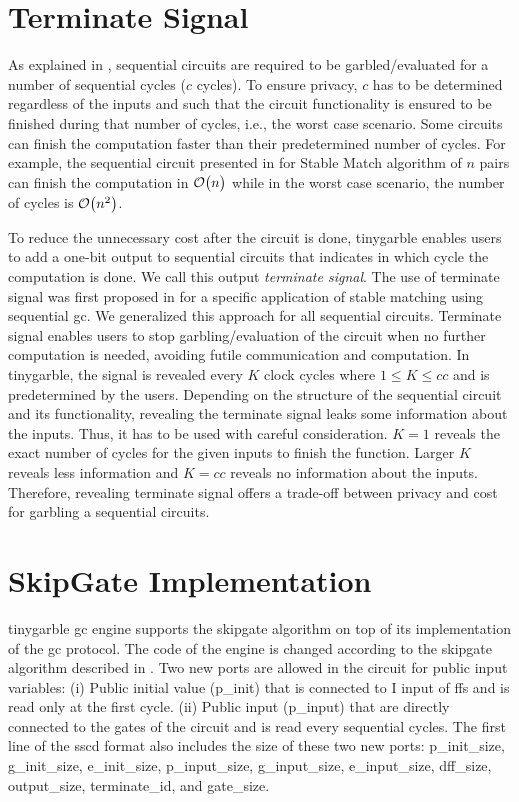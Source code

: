 \section{Terminate Signal}\label{sec:engine-term}
As explained in , sequential circuits are required to be garbled/evaluated for a number of sequential cycles ($c$ cycles).
To ensure privacy, $c$ has to be determined regardless of the inputs and such that the circuit functionality is ensured to be finished during that number of cycles, i.e., the worst case scenario.
Some circuits can finish the computation faster than their predetermined number of cycles.
For example, the sequential circuit presented in \cite{riazi2017toward} for Stable Match algorithm of $n$ pairs can finish the computation in $\mathcal{O}\bigl(n\bigr)$ while in the worst case scenario, the number of cycles is $\mathcal{O}\bigl(n^2\bigr)$.

To reduce the unnecessary cost after the circuit is done, \gls{tinygarble} enables users to add a one-bit output to sequential circuits that indicates in which cycle the computation is done.
We call this output \textit{terminate signal}.
The use of terminate signal was first proposed in \cite{riazi2017toward} for a specific application of stable matching using sequential \acrshort{gc}.
We generalized this approach for all sequential circuits.
Terminate signal enables users to stop garbling/evaluation of the circuit when no further computation is needed, avoiding futile communication and computation.
In \gls{tinygarble}, the signal is revealed every $K$ clock cycles where $1 \le K \le cc$ and is predetermined by the users.
Depending on the structure of the sequential circuit and its functionality, revealing the terminate signal leaks some information about the inputs.
Thus, it has to be used with careful consideration.
$K=1$ reveals the exact number of cycles for the given inputs to finish the function.
Larger $K$ reveals less information and $K=cc$ reveals no information about the inputs.
Therefore, revealing terminate signal offers a trade-off between privacy and cost for garbling a sequential circuits.

\section{SkipGate Implementation}\label{sec:engine-skipgate}
\gls{tinygarble} \acrshort{gc} engine supports the \gls{skipgate} algorithm on top of its implementation of the \acrshort{gc} protocol.
The code of the engine is changed according to the \gls{skipgate} algorithm described in .
Two new ports are allowed in the circuit for public input variables: (i) Public initial value (p\_init) that is connected to I input of \acrshort{ff}s and is read only at the first cycle. (ii) Public input (p\_input) that are directly connected to the gates of the circuit and is read every sequential cycles.
The first line of the \acrshort{sscd} format also includes the size of these two new ports: p\_init\_size,  g\_init\_size, e\_init\_size, p\_input\_size, g\_input\_size, e\_input\_size, dff\_size, output\_size, terminate\_id, and gate\_size.
